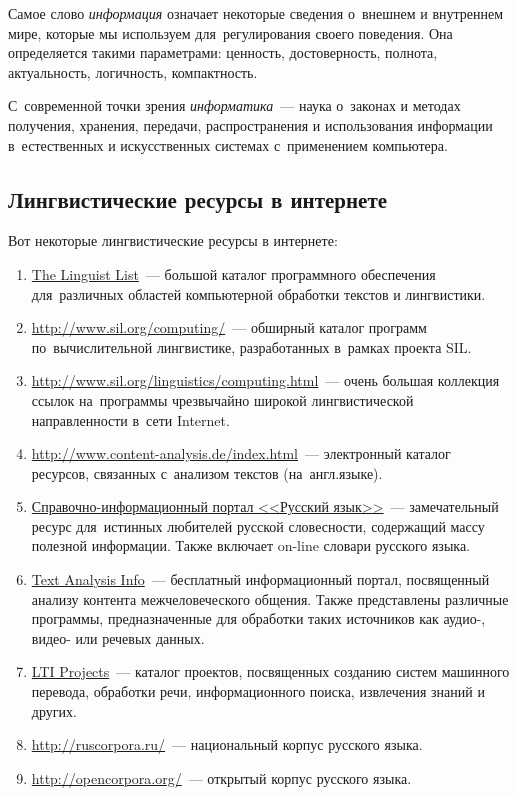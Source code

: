 \documentclass[12pt]{article}
\theoremstyle{definition}
\theoremstyle{remark}
\numberwithin{equation}{section}
\begin{document}
Самое слово {\sl информация} означает некоторые сведения о~внешнем и
внутреннем мире, которые мы используем для~регулирования своего 
поведения. Она определяется такими параметрами: ценность, достоверность, 
полнота, актуальность, логичность, компактность.

С~современной точки зрения {\sl информатика}~--- наука о~законах и 
методах получения, хранения, передачи, распространения и использования 
информации в~естественных и искусственных системах с~применением 
компьютера.

\subsection{Лингвистические ресурсы в интернете}
Вот некоторые лингвистические ресурсы в интернете:
\begin{enumerate}[label=\*]
    \item \href{http://linguistlist.org/}{The Linguist List}~--- большой
    каталог программного обеспечения для~различных областей компьютерной
    обработки текстов и лингвистики.
    \item \url{http://www.sil.org/computing/}~--- обширный каталог 
    программ по~вычислительной лингвистике, разработанных в~рамках 
    проекта SIL.
    \item \url{http://www.sil.org/linguistics/computing.html}~--- очень 
    большая коллекция ссылок на~программы чрезвычайно широкой лингвистической
    направленности в~сети Internet.
    \item \url{http://www.content-analysis.de/index.html}~--- электронный
    каталог ресурсов, связанных с~анализом текстов (на~англ.языке).
    \item \href{http://www.gramota.ru/index.html}{Справочно-информационный
    портал <<Русский язык>>}~--- замечательный ресурс для~истинных 
    любителей русской словесности, содержащий массу полезной информации. 
    Также включает on-line словари русского языка.
    \item \href{http://www.textanalysis.info/}{Text Analysis Info}~--- 
    бесплатный информационный портал, посвященный анализу контента 
    межчеловеческого общения. Также представлены различные программы, 
    предназначенные для обработки таких источников как аудио-, видео- или 
    речевых данных.
    \item \href{http://www.lti.cs.cmu.edu/research/projects}{LTI Projects}~---
    каталог проектов, посвященных созданию систем машинного перевода, 
    обработки речи, информационного поиска, извлечения знаний и других.
    \item \url{http://ruscorpora.ru/}~--- национальный корпус русского языка.
    \item \url{http://opencorpora.org/}~--- открытый корпус русского языка.
\end{enumerate}
\end{document}
